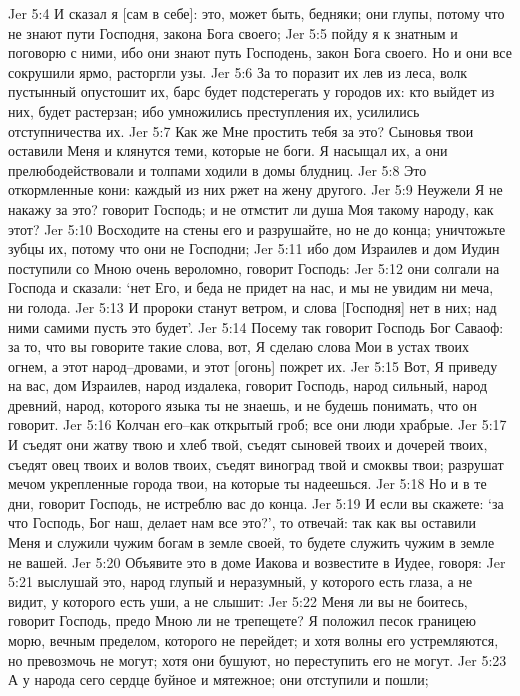 Jer 5:4  И сказал я [сам в себе]: это, может быть, бедняки; они глупы, потому что не знают пути Господня, закона Бога своего;
Jer 5:5  пойду я к знатным и поговорю с ними, ибо они знают путь Господень, закон Бога своего. Но и они все сокрушили ярмо, расторгли узы.
Jer 5:6  За то поразит их лев из леса, волк пустынный опустошит их, барс будет подстерегать у городов их: кто выйдет из них, будет растерзан; ибо умножились преступления их, усилились отступничества их.
Jer 5:7  Как же Мне простить тебя за это? Сыновья твои оставили Меня и клянутся теми, которые не боги. Я насыщал их, а они прелюбодействовали и толпами ходили в домы блудниц.
Jer 5:8  Это откормленные кони: каждый из них ржет на жену другого.
Jer 5:9  Неужели Я не накажу за это? говорит Господь; и не отмстит ли душа Моя такому народу, как этот?
Jer 5:10  Восходите на стены его и разрушайте, но не до конца; уничтожьте зубцы их, потому что они не Господни;
Jer 5:11  ибо дом Израилев и дом Иудин поступили со Мною очень вероломно, говорит Господь:
Jer 5:12  они солгали на Господа и сказали: `нет Его, и беда не придет на нас, и мы не увидим ни меча, ни голода.
Jer 5:13  И пророки станут ветром, и слова [Господня] нет в них; над ними самими пусть это будет'.
Jer 5:14  Посему так говорит Господь Бог Саваоф: за то, что вы говорите такие слова, вот, Я сделаю слова Мои в устах твоих огнем, а этот народ--дровами, и этот [огонь] пожрет их.
Jer 5:15  Вот, Я приведу на вас, дом Израилев, народ издалека, говорит Господь, народ сильный, народ древний, народ, которого языка ты не знаешь, и не будешь понимать, что он говорит.
Jer 5:16  Колчан его--как открытый гроб; все они люди храбрые.
Jer 5:17  И съедят они жатву твою и хлеб твой, съедят сыновей твоих и дочерей твоих, съедят овец твоих и волов твоих, съедят виноград твой и смоквы твои; разрушат мечом укрепленные города твои, на которые ты надеешься.
Jer 5:18  Но и в те дни, говорит Господь, не истреблю вас до конца.
Jer 5:19  И если вы скажете: `за что Господь, Бог наш, делает нам все это?', то отвечай: так как вы оставили Меня и служили чужим богам в земле своей, то будете служить чужим в земле не вашей.
Jer 5:20  Объявите это в доме Иакова и возвестите в Иудее, говоря:
Jer 5:21  выслушай это, народ глупый и неразумный, у которого есть глаза, а не видит, у которого есть уши, а не слышит:
Jer 5:22  Меня ли вы не боитесь, говорит Господь, предо Мною ли не трепещете? Я положил песок границею морю, вечным пределом, которого не перейдет; и хотя волны его устремляются, но превозмочь не могут; хотя они бушуют, но переступить его не могут.
Jer 5:23  А у народа сего сердце буйное и мятежное; они отступили и пошли;

